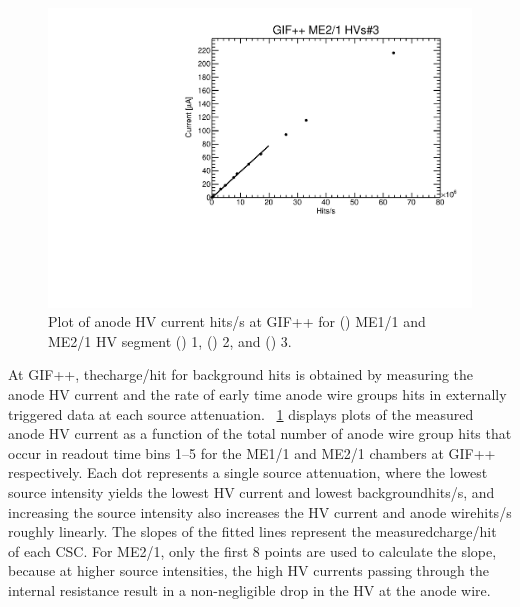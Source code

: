 \begin{figure}
	\includegraphics[width=\halfFigWidth]{figures/neutron/g_S3_C110.pdf}
  \caption[Plot of anode HV current \vs\unit{hits/s} at GIF++ for ME1/1 and ME2/1 HV segments.]{Plot of anode HV current \vs\unit{hits/s} at GIF++ for () ME1/1 and ME2/1 HV segment () 1, () 2, and () 3.}
	\label{fig:GIF_IvsH}
\end{figure}

At GIF++, the\unit{charge/hit} for background hits is obtained by measuring the anode HV current and the rate of early time anode wire groups hits in externally triggered data at each source attenuation. \Fig~\ref{fig:GIF_IvsH} displays plots of the measured anode HV current as a function of the total number of anode wire group hits that occur in readout time bins 1--5 for the ME1/1 and ME2/1 chambers at GIF++ respectively. Each dot represents a single source attenuation, where the lowest source intensity yields the lowest HV current and lowest background\unit{hits/s}, and increasing the source intensity also increases the HV current and anode wire\unit{hits/s} roughly linearly. The slopes of the fitted lines represent the measured\unit{charge/hit} of each CSC. For ME2/1, only the first 8 points are used to calculate the slope, because at higher source intensities, the high HV currents passing through the internal resistance result in a non-negligible drop in the HV at the anode wire.

